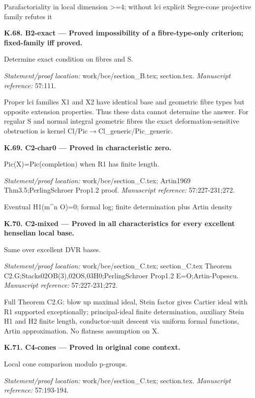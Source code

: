 \par Parafactoriality in local dimension >=4; without lci explicit Segre-cone projective family refutes it
\par\medskip\noindent\textbf{K.68. B2-exact --- Proved impossibility of a fibre-type-only criterion; fixed-family iff proved.}\par
Determine exact condition on fibres and S.
\par\emph{Statement/proof location:} work/bce/section\_B.tex; section.tex.
\emph{Manuscript reference:} 57:111.
\par Proper lci families X1 and X2 have identical base and geometric fibre types but opposite extension properties. Thus these data cannot determine the answer. For regular S and normal integral geometric fibres the exact deformation-sensitive obstruction is kernel Cl/Pic\ensuremath{\to}Cl\_generic/Pic\_generic.
\par\medskip\noindent\textbf{K.69. C2-char0 --- Proved in characteristic zero.}\par
Pic(X)=Pic(completion) when R1 has finite length.
\par\emph{Statement/proof location:} work/bce/section\_C.tex; Artin1969 Thm3.5;PerlingSchroer Prop1.2 proof.
\emph{Manuscript reference:} 57:227-231;272.
\par Eventual H1(m\textasciicircum{}n O)=0; formal log; finite determination plus Artin density
\par\medskip\noindent\textbf{K.70. C2-mixed --- Proved in all characteristics for every excellent henselian local base.}\par
Same over excellent DVR bases.
\par\emph{Statement/proof location:} work/bce/section\_C.tex; section\_C.tex Theorem C2.G;Stacks02OB(3),02OS,03H0;PerlingSchroer Prop1.2 E=O;Artin-Popescu.
\emph{Manuscript reference:} 57:227-231;272.
\par Full Theorem C2.G: blow up maximal ideal, Stein factor gives Cartier ideal with R1 supported exceptionally; principal-ideal finite determination, auxiliary Stein H1 and H2 finite length, conductor-unit descent via uniform formal functions, Artin approximation. No flatness assumption on X.
\par\medskip\noindent\textbf{K.71. C4-cones --- Proved in original cone context.}\par
Local cone comparison modulo p-groups.
\par\emph{Statement/proof location:} work/bce/section\_C.tex; section.tex.
\emph{Manuscript reference:} 57:193-194.
